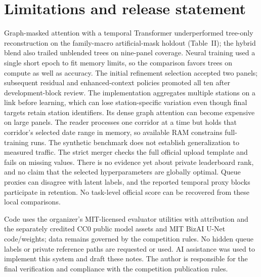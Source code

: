 \documentclass[conference]{IEEEtran}
\begin{document}
\section{Limitations and release statement}
Graph-masked attention with a temporal Transformer underperformed tree-only
reconstruction on the family-macro artificial-mask holdout (Table~II); the hybrid
blend also trailed unblended trees on nine-panel coverage. Neural training used
a single short epoch to fit memory limits, so the comparison favors trees on
compute as well as accuracy. The initial refinement selection accepted two panels; subsequent residual and enhanced-context policies promoted all ten after development-block review.
The implementation aggregates multiple stations on a link before learning,
which can lose station-specific variation even though final targets retain
station identifiers. Its dense graph attention can become expensive on large
panels. The reader processes one corridor at a time but holds that corridor's
selected date range in memory, so available RAM constrains full-training runs.
The synthetic benchmark does not establish generalization to measured traffic.
The strict merger checks the full official upload template and fails on missing values. There is no evidence yet about private leaderboard rank, and no claim that the selected hyperparameters are globally optimal. Queue proxies can disagree with latent labels, and the reported temporal proxy blocks participate in retention. No task-level official score can be recovered from these local comparisons.

Code uses the organizer's MIT-licensed evaluator utilities with attribution and the separately credited CC0 public model assets and MIT BizAI U-Net code/weights;
data remains governed by the competition rules. No hidden queue labels or private reference paths are requested or used.
AI assistance was used to implement this system and draft these notes. The author is responsible for the final verification and compliance with the competition publication rules.



\end{document}
